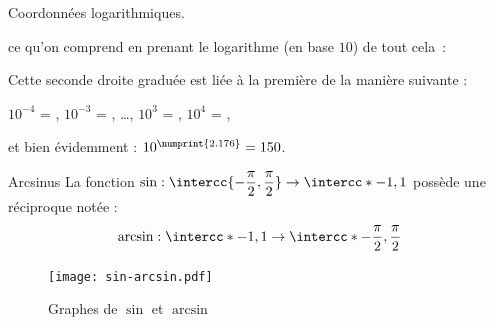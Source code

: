 \documentclass[french,xcolor=svgnames]{beamer}
\begin{document}
\begin{frame}[fragile]{Coordonnées logarithmiques.}
\begin{center}
\end{center}
ce qu'on comprend en \og prenant le logarithme (en base $10$) de tout
cela~:\fg{}
\begin{center}
\end{center}
Cette seconde droite graduée est liée à la première de la manière suivante :
\begin{center}
$10^{-4}$ = , $10^{-3}$ = , \dots, $10^{3}$ = , $10^{4}$ = ,
\end{center}
et bien évidemment : $10^{\numprint{2.176}} = 150$.
\end{frame}
\begin{frame}{Arcsinus}
La fonction $\sin : \intercc{-\dfrac{\pi}{2}, \dfrac{\pi}{2}} \to \intercc*{-1,1}$
possède une réciproque notée :
\begin{equation*}
\arcsin : \intercc*{-1,1} \to \intercc*{-\dfrac{\pi}{2},\dfrac{\pi}{2}}
\end{equation*}

\begin{figure}[ht!]
\centering
\texttt{[image: sin-arcsin.pdf]}
\caption{Graphes de $\sin$ et $\arcsin$}
\end{figure}
\end{frame}
\end{document}
